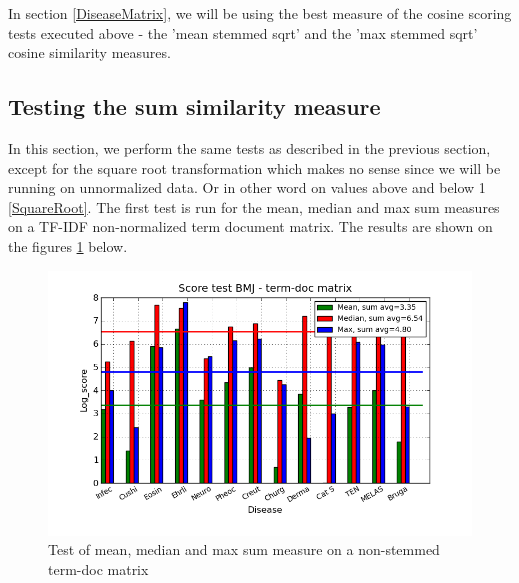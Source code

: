 In section \ref{DiseaseMatrix}, we will be using the best measure of the cosine scoring tests 
executed above - the 'mean stemmed sqrt' and the 'max stemmed sqrt' cosine similarity measures.

\subsection{Testing the sum similarity measure\label{TestingSumSimilarity}}

In this section, we perform the same tests as described in the previous section, except for the square 
root transformation which makes no sense since we will be running on unnormalized data. Or in 
other word on values above and below 1 \ref{SquareRoot}. The first test is run for the mean, 
median and max sum measures on a TF-IDF non-normalized term document matrix. The results are 
shown on the figures \ref{termDoc_bmj_hist_3000_sum_mea_med_max} below. 

\begin{figure}[H]
  \caption{Test of mean, median and max sum measure on a non-stemmed term-doc matrix}
  \begin{center}
    \includegraphics[width=1.2\textwidth]{barcharts/termDoc_bmj_hist_3000_sum_mea_med_max.png}
  \end{center}
  \label{termDoc_bmj_hist_3000_sum_mea_med_max}
\end{figure}

